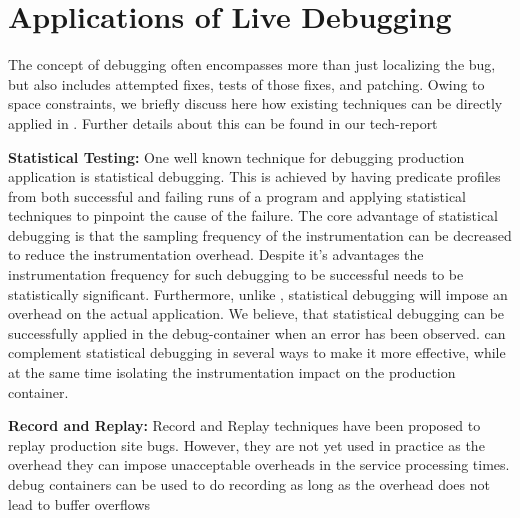 \section{Applications of Live Debugging}
\label{statistical}
The concept of debugging often encompasses more than just localizing the bug, but also includes attempted fixes, tests of those fixes, and patching.
Owing to space constraints, we briefly discuss here how existing techniques can be directly applied in \parikshan. 
Further details about this can be found in our tech-report~\cite{parikshanTR}

\noindent
\textbf{Statistical Testing:}
One well known technique for debugging production application is statistical debugging. 
This is achieved by having predicate profiles from both successful and failing runs of a program and applying statistical techniques to pinpoint the cause of the failure.
The core advantage of statistical debugging is that the sampling frequency of the instrumentation can be decreased to reduce the instrumentation overhead.
Despite it's advantages the instrumentation frequency for such debugging to be successful needs to be statistically significant. 
Furthermore, unlike \parikshan, statistical debugging will impose an overhead on the actual application. 
We believe, that statistical debugging can be successfully applied in the debug-container when an error has been observed. 
\parikshan can complement statistical debugging in several ways to make it more effective, while at the same time isolating the instrumentation impact on the production container.

\noindent
\textbf{Record and Replay:}
Record and Replay techniques have been proposed to replay production site bugs. 
However, they are not yet used in practice as the overhead they can impose unacceptable overheads in the service processing times.
\parikshan debug containers can be used to do recording as long as the overhead does not lead to buffer overflows

